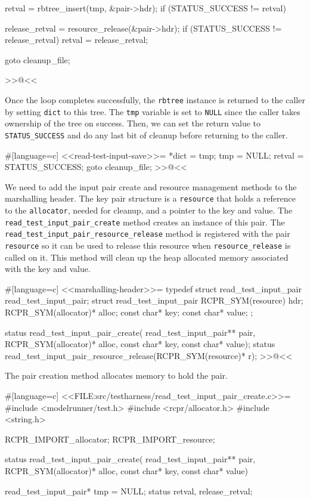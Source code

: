 {{        retval = rbtree_insert(tmp, &pair->hdr);
        if (STATUS_SUCCESS != retval)
        {
            release_retval = resource_release(&pair->hdr);
            if (STATUS_SUCCESS != release_retval)
            {
                retval = release_retval;
            }

            goto cleanup_file;
        }
    }
>>@<<

Once the loop completes successfully, the \verb/rbtree/ instance is returned to
the caller by setting \verb/dict/ to this tree. The \verb/tmp/ variable is set
to \verb/NULL/ since the caller takes ownership of the tree on success. Then, we
can set the return value to \verb/STATUS_SUCCESS/ and do any last bit of cleanup
before returning to the caller.

#[language=c]
<<read-test-input-save>>=
    *dict = tmp;
    tmp = NULL;
    retval = STATUS_SUCCESS;
    goto cleanup_file;
>>@<<

We need to add the input pair create and resource management methods to the
marshalling header. The key pair structure is a \verb/resource/ that holds a
reference to the \verb/allocator/, needed for cleanup, and a pointer to the key
and value. The \verb/read_test_input_pair_create/ method creates an instance of
this pair. The \verb/read_test_input_pair_resource_release/ method is registered
with the pair \verb/resource/ so it can be used to release this resource when
\verb/resource_release/ is called on it. This method will clean up the heap
allocated memory associated with the key and value.

#[language=c]
<<marshalling-header>>=
typedef struct read_test_input_pair read_test_input_pair;
struct read_test_input_pair
{
    RCPR_SYM(resource) hdr;
    RCPR_SYM(allocator)* alloc;
    const char* key;
    const char* value;
};

status read_test_input_pair_create(
    read_test_input_pair** pair, RCPR_SYM(allocator)* alloc, const char* key,
    const char* value);
status read_test_input_pair_resource_release(RCPR_SYM(resource)* r);
>>@<<

The pair creation method allocates memory to hold the pair.

#[language=c]
<<FILE:src/testharness/read_test_input_pair_create.c>>=
#include <modelrunner/test.h>
#include <rcpr/allocator.h>
#include <string.h>

RCPR_IMPORT_allocator;
RCPR_IMPORT_resource;

status read_test_input_pair_create(
    read_test_input_pair** pair, RCPR_SYM(allocator)* alloc, const char* key,
    const char* value)
{
    read_test_input_pair* tmp = NULL;
    status retval, release_retval;

}}
